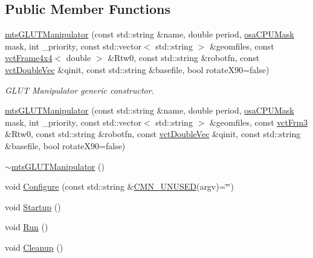 \subsection*{Public Member Functions}
\begin{DoxyCompactItemize}
\item 
\hyperlink{classmts_g_l_u_t_manipulator_a1e7811133de2349f3dde7e3fd3960ef2}{mts\+G\+L\+U\+T\+Manipulator} (const std\+::string \&name, double period, \hyperlink{osa_c_p_u_affinity_8h_aaec7cdd7797e5e6eb5438c15fee5477a}{osa\+C\+P\+U\+Mask} mask, int \+\_\+priority, const std\+::vector$<$ std\+::string $>$ \&geomfiles, const \hyperlink{classvct_frame4x4}{vct\+Frame4x4}$<$ double $>$ \&Rtw0, const std\+::string \&robotfn, const \hyperlink{vct_dynamic_vector_types_8h_ade4b3068c86fb88f41af2e5187e491c2}{vct\+Double\+Vec} \&qinit, const std\+::string \&basefile, bool rotate\+X90=false)
\begin{DoxyCompactList}\small\item\em G\+L\+U\+T Manipulator generic constructor. \end{DoxyCompactList}\item 
\hyperlink{classmts_g_l_u_t_manipulator_aff586ecc21c6190eca6e6bd30feb68b6}{mts\+G\+L\+U\+T\+Manipulator} (const std\+::string \&name, double period, \hyperlink{osa_c_p_u_affinity_8h_aaec7cdd7797e5e6eb5438c15fee5477a}{osa\+C\+P\+U\+Mask} mask, int \+\_\+priority, const std\+::vector$<$ std\+::string $>$ \&geomfiles, const \hyperlink{vct_transformation_types_8h_a81feda0a02c2d1bc26e5553f409fed20}{vct\+Frm3} \&Rtw0, const std\+::string \&robotfn, const \hyperlink{vct_dynamic_vector_types_8h_ade4b3068c86fb88f41af2e5187e491c2}{vct\+Double\+Vec} \&qinit, const std\+::string \&basefile, bool rotate\+X90=false)
\item 
\hyperlink{classmts_g_l_u_t_manipulator_aa368d4711cf2993663bc1d605f07d2a1}{$\sim$mts\+G\+L\+U\+T\+Manipulator} ()
\item 
void \hyperlink{classmts_g_l_u_t_manipulator_a7d4223551917fc3a2aa8a8ae1c364246}{Configure} (const std\+::string \&\hyperlink{cmn_portability_8h_a021894e2626935fa2305434b1e893ff6}{C\+M\+N\+\_\+\+U\+N\+U\+S\+E\+D}(argv)=\char`\"{}\char`\"{})
\item 
void \hyperlink{classmts_g_l_u_t_manipulator_a8ac4e40198ddb4afdafb06e354285303}{Startup} ()
\item 
void \hyperlink{classmts_g_l_u_t_manipulator_a1a8729d2fe65bc4934ea7a99752d8b1f}{Run} ()
\item 
void \hyperlink{classmts_g_l_u_t_manipulator_a3913f7c2b08369f300bc9c6e646f1df0}{Cleanup} ()
\end{DoxyCompactItemize}
